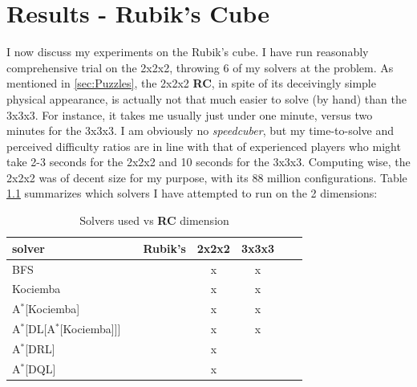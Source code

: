 
\chapter{Results - Rubik's Cube} %

\label{sec:ResRubiks} %


I now discuss my experiments on the Rubik's cube. I have run reasonably comprehensive trial on the 2x2x2, throwing 6 of my solvers at the problem. As mentioned in \ref{sec:Puzzles}, the 2x2x2 \textbf{RC}, in spite of its deceivingly simple physical appearance, is actually not that much easier to solve (by hand) than the 3x3x3. For instance, it takes me usually just under one minute, versus two minutes for the 3x3x3. I am obviously no \textit{speedcuber}, but my time-to-solve and perceived difficulty ratios are in line with that of experienced players who might take 2-3 seconds for the 2x2x2 and 10 seconds for the 3x3x3. Computing wise, the 2x2x2 was of decent size for my purpose, with its 88 million configurations. Table \ref{tab:gridRC} summarizes which solvers I have attempted to run on the 2 dimensions:

\begin{table}[H]
\begin{center}
\begin{tabular}{l*{5}{c}r}
\hline
\textbf{solver}      & & \textbf{Rubik's} & \textbf{2x2x2} & \textbf{3x3x3} \\
\hline
BFS   &   &        &  x  &  x  \\
\hline
Kociemba   &   &      &  x  &  x  \\
\hline
A$^{*}$[Kociemba]  &   &  &  x  &  x  \\
\hline
A$^{*}$[DL[A$^{*}$[Kociemba]]]  &   &  &  x  &  x  \\
\hline
A$^{*}$[DRL]  &   &  &  x  &  \\
\hline
A$^{*}$[DQL]  &   &  &  x  &  \\
\hline
\end{tabular}
\caption{\label{tab:gridRC} Solvers used vs \textbf{RC} dimension}
\end{center}
\end{table}








